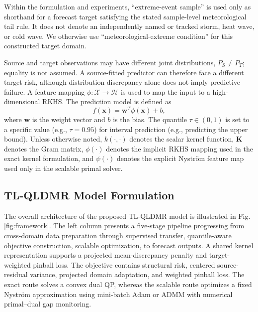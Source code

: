 \documentclass[a4paper]{cas-sc}
\begin{document}
{\color{blue}Within the formulation and experiments, ``extreme-event sample'' is used only as shorthand for a forecast target satisfying the stated sample-level meteorological tail rule. It does not denote an independently named or tracked storm, heat wave, or cold wave. We otherwise use ``meteorological-extreme condition'' for this constructed target domain.}

{\color{blue}Source and target observations may have different joint distributions, $P_S\ne P_T$; equality is not assumed. A source-fitted predictor can therefore face a different target risk, although distribution discrepancy alone does not imply predictive failure.}
A feature mapping $\phi: \mathcal{X} \to \mathcal{H}$ is used to map the input to a high-dimensional RKHS. The prediction model is defined as
\begin{equation}
f(\boldsymbol{x}) = \boldsymbol{w}^T \phi(\boldsymbol{x}) + b,
\end{equation}
where $\boldsymbol{w}$ is the weight vector and $b$ is the bias. The quantile $\tau \in (0, 1)$ is set to a specific value (e.g., $\tau=0.95$) for interval prediction (e.g., predicting the upper bound).
Unless otherwise noted, $k(\cdot,\cdot)$ denotes the scalar kernel function, $\boldsymbol{K}$ denotes the Gram matrix, $\phi(\cdot)$ denotes the implicit RKHS mapping used in the exact kernel formulation, and $\psi(\cdot)$ denotes the explicit Nystr\"{o}m feature map used only in the scalable primal solver.



\subsection{TL-QLDMR Model Formulation}\label{MODEL}
The overall architecture of the proposed TL-QLDMR model is illustrated in Fig. \ref{fig:framework}. The left column presents a five-stage pipeline progressing from cross-domain data preparation through supervised transfer, quantile-aware objective construction, scalable optimization, to forecast outputs. {\color{blue}A shared kernel representation supports a projected mean-discrepancy penalty and target-weighted pinball loss. The objective contains structural risk, centered source-residual variance, projected domain adaptation, and weighted pinball loss. The exact route solves a convex dual QP, whereas the scalable route optimizes a fixed Nystr\"{o}m approximation using mini-batch Adam or ADMM with numerical primal--dual gap monitoring.}
\end{document}
